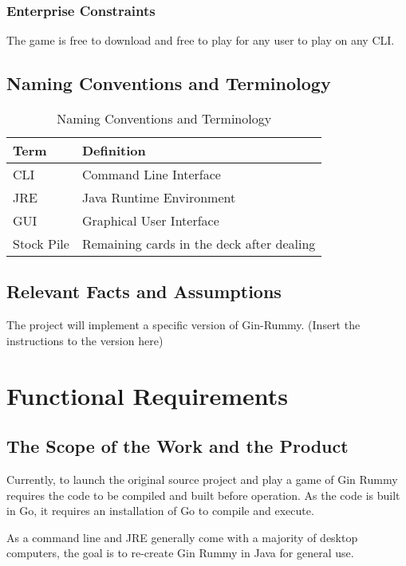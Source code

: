 \documentclass[12pt, titlepage]{article}
\begin{document}
\subsubsection{Enterprise Constraints}
The game is free to download and free to play for any user to play on any CLI. 

\subsection{Naming Conventions and Terminology}
\begin{table}[H]
\caption{Naming Conventions and Terminology}
    \centering
    \begin{tabular}{ |p{5cm}|p{7.5cm}| }
    \hline
    \textbf{Term} & \textbf{Definition} \\
    \hline
    CLI & Command Line Interface \\
    \hline
    JRE & Java Runtime Environment \\
    \hline
    GUI & Graphical User Interface \\
    \hline
    Stock Pile & Remaining cards in the deck after dealing \\
    \hline
    \end{tabular}
\end{table}

\subsection{Relevant Facts and Assumptions}

The project will implement a specific version of Gin-Rummy. (Insert the instructions to the version here) %

\section{Functional Requirements}
\subsection{The Scope of the Work and the Product}
Currently, to launch the original source project and play a game of Gin Rummy requires the code to be compiled and built before operation. As the code is built in Go, it requires an installation of Go to compile and execute. %

As a command line and JRE generally come with a majority of desktop computers, the goal is to re-create Gin Rummy in Java for general use. %
\end{document}
